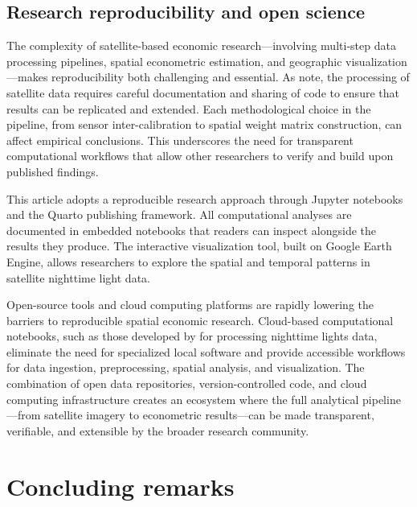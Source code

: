 \documentclass[
  a4paper, 
  twoside,
  review
]{article}
\newcounter{code}
\begin{document}
\subsection{Research reproducibility and open
science}\label{research-reproducibility-and-open-science}

The complexity of satellite-based economic research---involving
multi-step data processing pipelines, spatial econometric estimation,
and geographic visualization---makes reproducibility both challenging
and essential. As \citet{donaldson_storeygard_remotesensing} note, the
processing of satellite data requires careful documentation and sharing
of code to ensure that results can be replicated and extended. Each
methodological choice in the pipeline, from sensor inter-calibration to
spatial weight matrix construction, can affect empirical conclusions.
This underscores the need for transparent computational workflows that
allow other researchers to verify and build upon published findings.

This article adopts a reproducible research approach through Jupyter
notebooks and the Quarto publishing framework. All computational
analyses are documented in embedded notebooks that readers can inspect
alongside the results they produce. The interactive visualization tool,
built on Google Earth Engine, allows researchers to explore the spatial
and temporal patterns in satellite nighttime light data.

Open-source tools and cloud computing platforms are rapidly lowering the
barriers to reproducible spatial economic research. Cloud-based
computational notebooks, such as those developed by
\citet{mendez_patnaik_notebook} for processing nighttime lights data,
eliminate the need for specialized local software and provide accessible
workflows for data ingestion, preprocessing, spatial analysis, and
visualization. The combination of open data repositories,
version-controlled code, and cloud computing infrastructure creates an
ecosystem where the full analytical pipeline---from satellite imagery to
econometric results---can be made transparent, verifiable, and
extensible by the broader research community.

\section{Concluding remarks}\label{concluding-remarks}
\end{document}

